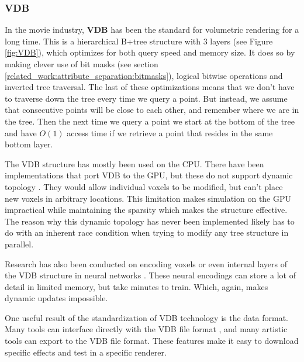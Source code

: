 \subsubsection{VDB} \label{related_work:voxel_data_structures:vdb}
In the movie industry, \textbf{VDB} \cite{museth2013vdb} has been the standard for volumetric rendering for a long time. This is a hierarchical B+tree structure with 3 layers (see Figure \ref{fig:VDB}), which optimizes for both query speed and memory size. It does so by making clever use of bit masks (see section \ref{related_work:attribute_separation:bitmasks}), logical bitwise operations and inverted tree traversal. The last of these optimizations means that we don't have to traverse down the tree every time we query a point. But instead, we assume that consecutive points will be close to each other, and remember where we are in the tree. Then the next time we query a point we start at the bottom of the tree and have $O(1)$ access time if we retrieve a point that resides in the same bottom layer.

The VDB structure has mostly been used on the CPU. There have been implementations that port VDB to the GPU, but these do not support dynamic topology \cite{hoetzlein2016gvdb} \cite{museth2021nanovdb}. They would allow individual voxels to be modified, but can't place new voxels in arbitrary locations. This limitation makes simulation on the GPU impractical while maintaining the sparsity which makes the structure effective. The reason why this dynamic topology has never been implemented likely has to do with an inherent race condition when trying to modify any tree structure in parallel.

Research has also been conducted on encoding voxels or even internal layers of the VDB structure in neural networks \cite{kim2022neuralvdb}. These neural encodings can store a lot of detail in limited memory, but take minutes to train. Which, again, makes dynamic updates impossible.

One useful result of the standardization of VDB technology is the data format. Many tools can interface directly with the VDB file format \cite{VDBADeepDive}, and many artistic tools can export to the VDB file format. These features make it easy to download specific effects and test in a specific renderer.

